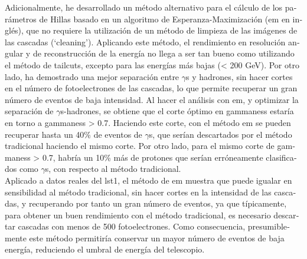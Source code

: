 \documentclass[main.tex]{subfiles}
\begin{document}
\begin{otherlanguage}{spanish}
Adicionalmente, he desarrollado un método alternativo para el cálculo de los parámetros de Hillas basado en un algoritmo de Esperanza-Maximización (\gls{em} en inglés), que no requiere la utilización de un método de limpieza de las imágenes de las cascadas (`cleaning'). Aplicando este método, el rendimiento en resolución angular y de reconstrucción de la energía no llega a ser tan bueno como utilizando el método de tailcuts, excepto para las energías más bajas (< 200 GeV). Por otro lado, ha demostrado una mejor separación entre $\gamma$s y hadrones, sin hacer cortes en el número de fotoelectrones de las cascadas, lo que permite recuperar un gran número de eventos de baja intensidad. Al hacer el análisis con \gls{em}, y optimizar la separación de $\gamma$s-hadrones, se obtiene que el corte óptimo en gammaness estaría en torno a gammaness > 0.7. Haciendo este corte, con el método \gls{em} se pueden recuperar hasta un 40\% de eventos de $\gamma$s, que serían descartados por el método tradicional haciendo el mismo corte. Por otro lado, para el mismo corte de gammaness > 0.7, habría un 10\% más de protones que serían erróneamente clasificados como $\gamma$s, con respecto al método tradicional.\\
Aplicado a datos reales del \gls{lst}1, el método de \gls{em} muestra que puede igualar en sensibilidad al método tradicional, sin hacer cortes en la intensidad de las cascadas, y recuperando por tanto un gran número de eventos, ya que típicamente, para obtener un buen rendimiento con el método tradicional, es necesario descartar cascadas con menos de 500 fotoelectrones. Como consecuencia, presumiblemente este método permitiría conservar un mayor número de eventos de baja energía, reduciendo el umbral de energía del telescopio.\\

\end{otherlanguage}
\end{document}
